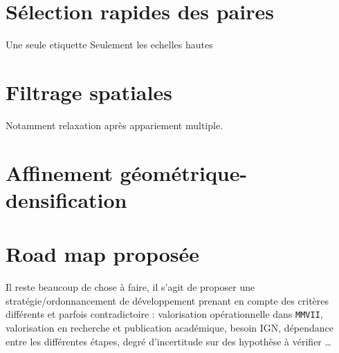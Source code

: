 \section{S\'election rapides des paires}

Une seule etiquette
Seulement les echelles hautes

\section{Filtrage spatiales}

Notamment relaxation apr\`es appariement multiple.

\section{Affinement g\'eom\'etrique-densification}


\section{Road map propos\'ee}

Il reste beaucoup de chose \`a faire, il s'agit de proposer une strat\'egie/ordonnancement de d\'eveloppement
prenant en compte des crit\`eres diff\'erents et parfois contradictoire :  valorisation
op\'erationnelle dans {\tt MMVII}, valorisation en recherche et publication acad\'emique,
besoin IGN, d\'ependance entre les diff\'erentes \'etapes, degr\'e d'incertitude sur des hypoth\`ese
\`a v\'erifier \dots 





